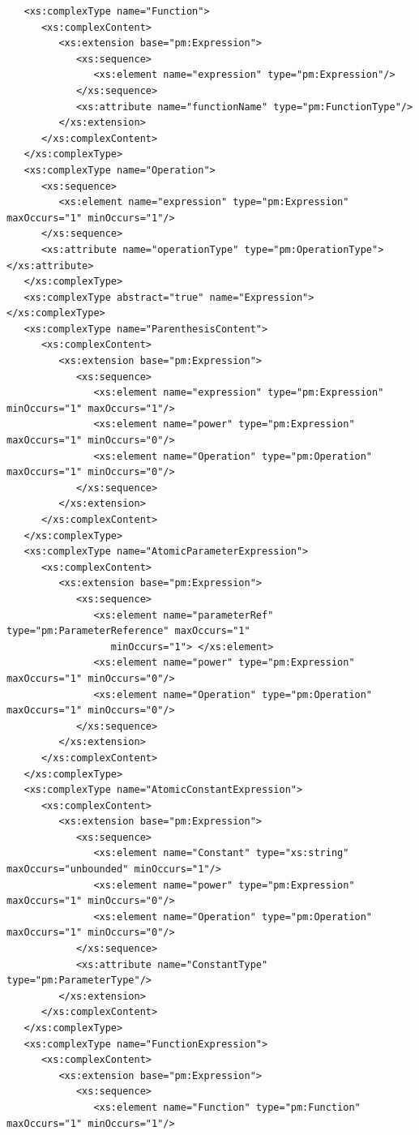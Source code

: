 \documentclass[a4paper,11pt] {ivoa}
\begin{document}
\begin{lstlisting}
   <xs:complexType name="Function">
      <xs:complexContent>
         <xs:extension base="pm:Expression">
            <xs:sequence>
               <xs:element name="expression" type="pm:Expression"/>
            </xs:sequence>
            <xs:attribute name="functionName" type="pm:FunctionType"/>
         </xs:extension>
      </xs:complexContent>
   </xs:complexType>
   <xs:complexType name="Operation">
      <xs:sequence>
         <xs:element name="expression" type="pm:Expression" maxOccurs="1" minOccurs="1"/>
      </xs:sequence>
      <xs:attribute name="operationType" type="pm:OperationType"> </xs:attribute>
   </xs:complexType>
   <xs:complexType abstract="true" name="Expression"> </xs:complexType>
   <xs:complexType name="ParenthesisContent">
      <xs:complexContent>
         <xs:extension base="pm:Expression">
            <xs:sequence>
               <xs:element name="expression" type="pm:Expression" minOccurs="1" maxOccurs="1"/>
               <xs:element name="power" type="pm:Expression" maxOccurs="1" minOccurs="0"/>
               <xs:element name="Operation" type="pm:Operation" maxOccurs="1" minOccurs="0"/>
            </xs:sequence>
         </xs:extension>
      </xs:complexContent>
   </xs:complexType>
   <xs:complexType name="AtomicParameterExpression">
      <xs:complexContent>
         <xs:extension base="pm:Expression">
            <xs:sequence>
               <xs:element name="parameterRef" type="pm:ParameterReference" maxOccurs="1"
                  minOccurs="1"> </xs:element>
               <xs:element name="power" type="pm:Expression" maxOccurs="1" minOccurs="0"/>
               <xs:element name="Operation" type="pm:Operation" maxOccurs="1" minOccurs="0"/>
            </xs:sequence>
         </xs:extension>
      </xs:complexContent>
   </xs:complexType>
   <xs:complexType name="AtomicConstantExpression">
      <xs:complexContent>
         <xs:extension base="pm:Expression">
            <xs:sequence>
               <xs:element name="Constant" type="xs:string" maxOccurs="unbounded" minOccurs="1"/>
               <xs:element name="power" type="pm:Expression" maxOccurs="1" minOccurs="0"/>
               <xs:element name="Operation" type="pm:Operation" maxOccurs="1" minOccurs="0"/>
            </xs:sequence>
            <xs:attribute name="ConstantType" type="pm:ParameterType"/>
         </xs:extension>
      </xs:complexContent>
   </xs:complexType>
   <xs:complexType name="FunctionExpression">
      <xs:complexContent>
         <xs:extension base="pm:Expression">
            <xs:sequence>
               <xs:element name="Function" type="pm:Function" maxOccurs="1" minOccurs="1"/>

\end{lstlisting}
\end{document}

